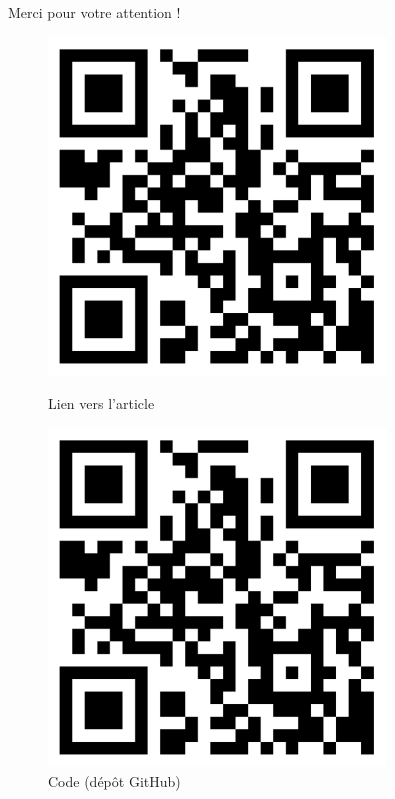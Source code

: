 \documentclass[11pt,aspectratio=169]{beamer}
\begin{document}
\begin{frame}[plain]
    \begin{center}
        \vspace{0.2cm}
        {\color{deepblue}\Huge Merci pour votre attention !}
        
        \vspace{0.5cm}
        
        \begin{figure}[h]
            \centering
            \begin{minipage}{0.45\textwidth}
                \centering
                \includegraphics[width=0.8\textwidth]{qrcode.jpg}
                \caption{Lien vers l'article}
            \end{minipage}
            \hspace{0.05\textwidth}
            \begin{minipage}{0.45\textwidth}
                \centering
                \includegraphics[width=0.8\textwidth]{qrcode.jpg}
                \caption{Code (dépôt GitHub)}
            \end{minipage}
        \end{figure}
    \end{center}
\end{frame}
\end{document}
